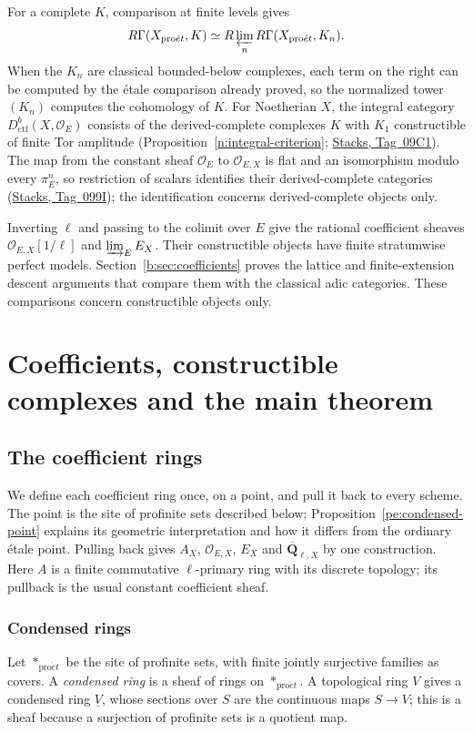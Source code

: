 \documentclass[11pt,a4paper]{article}
\numberwithin{equation}{section}
\theoremstyle{definition}
\theoremstyle{remark}
\newcommand{\proet}{\mathrm{pro}\acute{e}t}
\newcommand{\stacks}[1]{\href{https://stacks.math.columbia.edu/tag/#1}{\textnormal{Stacks, Tag~#1}}}
\newcommand{\QbarX}{\overline{\mathbf Q}_{\ell,X}}
\newcommand{\Dctf}{D^b_{\mathrm{ctf}}}
\begin{document}
For a complete $K$, comparison at finite levels gives
\[
 R\Gamma(X_{\proet},K)
    \simeq R\varprojlim_nR\Gamma(X_{\proet},K_n).
\]
When the $K_n$ are classical bounded-below complexes, each term on the
right can be computed by the \'etale comparison already proved, so
the normalized tower $(K_n)$ computes the cohomology of $K$. For Noetherian $X$, the integral category $\Dctf(X,\mathcal O_E)$
consists of the derived-complete complexes $K$ with $K_1$ constructible
of finite Tor amplitude (Proposition~\ref{n:integral-criterion};
\stacks{09C1}). The map from the constant sheaf $\mathcal O_E$ to $\mathcal O_{E,X}$ is
flat and an isomorphism modulo every $\pi_E^n$, so restriction of scalars
identifies their derived-complete categories (\stacks{099I}); the
identification concerns derived-complete objects only.

Inverting $\ell$ and passing to the colimit over $E$ give the rational
coefficient sheaves $\mathcal O_{E,X}[1/\ell]$ and $\varinjlim_E E_X$. Their
constructible objects have finite stratumwise perfect models.
Section~\ref{b:sec:coefficients} proves the lattice and
finite-extension descent arguments that compare them with the classical
adic categories. These comparisons concern constructible objects only.

\section{Coefficients, constructible complexes and the main theorem}
\label{sec:setting}

\subsection{The coefficient rings}
\label{n:coefficients}
We define each coefficient ring once, on a point, and pull it back to
every scheme. The point is the site of profinite sets described below;
Proposition~\ref{pe:condensed-point} explains its geometric
interpretation and how it differs from the ordinary \'etale point.
Pulling back gives $A_X$, $\mathcal O_{E,X}$, $E_X$ and $\QbarX$
by one construction. Here $A$ is a finite commutative $\ell$-primary
ring with its discrete topology; its pullback is the usual constant
coefficient sheaf.

\subsubsection{Condensed rings}
Let $*_{\proet}$ be the site of profinite sets, with finite jointly
surjective families as covers. A \emph{condensed ring} is a sheaf of
rings on $*_{\proet}$. A topological ring $V$ gives a condensed ring
$\underline V$, whose sections over $S$ are the continuous maps $S\to V$;
this is a sheaf because a surjection of profinite sets is a quotient map.
\end{document}
